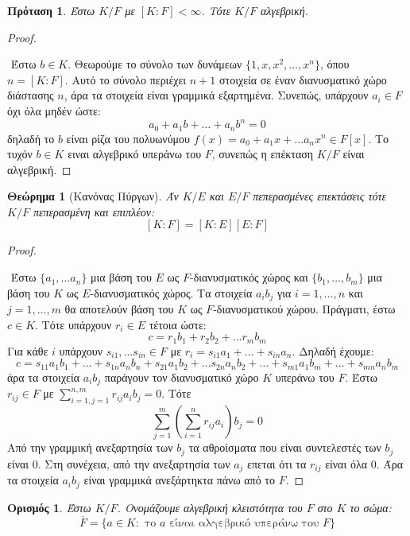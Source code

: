 \documentclass[oneside,a4paper]{article}
\newtheorem{theorem}{Θεώρημα}
\newtheorem*{defn}{Ορισμός}
\newtheorem{prop}{Πρόταση}
\begin{document}
\begin{prop}
	Έστω $K/F$ με $[K:F]<\infty$. Τότε $K/F$ αλγεβρική.
\end{prop}

\begin{proof} $ $

	$ $\newline
	Έστω $b \in K$. Θεωρούμε το σύνολο των δυνάμεων $\{1,x,x^2,\ldots,x^n\}$, όπου $n = [K:F]$. Αυτό το σύνολο περιέχει $n+1$ στοιχεία σε έναν διανυσματικό χώρο διάστασης $n$, άρα τα στοιχεία είναι γραμμικά εξαρτημένα. Συνεπώς, υπάρχουν $a_i \in F$ όχι όλα μηδέν ώστε:
	$$a_0 + a_1 b + \ldots + a_n b^n = 0$$
	δηλαδή το $b$ είναι ρίζα του πολυωνύμου $f(x) = a_0 + a_1 x + \ldots a_n x^n \in F[x]$. Το τυχόν $b \in K$ ειναι αλγεβρικό υπεράνω του $F$, συνεπώς η επέκταση $K/F$ είναι αλγεβρική.
\end{proof}

\begin{theorem}[Κανόνας Πύργων]
	Άν $K/E$ και $E/F$ πεπερασμένες επεκτάσεις τότε $K/F$ πεπερασμένη και επιπλέον:
	$$[K:F]=[K:E][E:F]$$
\end{theorem}

\begin{proof} $ $
	
	$ $\newline
	Έστω $\{a_1 , \ldots a_n\}$ μια βάση του $E$ ως $F$-διανυσματικός χώρος και $\{b_1,\ldots,b_m\}$ μια βάση του $K$ ως $E$-διανυσματικός χώρος. Τα στοιχεία $a_i b_j$ για $i=1,\ldots,n$ και $j=1,\ldots,m$ θα αποτελούν βάση του $K$ ως $F$-διανυσματικού χώρου. Πράγματι, έστω $c \in K$. Τότε υπάρχουν $r_i \in E$ τέτοια ώστε:
	$$c = r_1 b_1 + r_2 b_2 + \ldots r_m b_m$$
	Για κάθε $i$ υπάρχουν $s_{i1},\ldots s_{in} \in F$ με $r_i = s_{i1} a_1 + \ldots + s_{in} a_n$. Δηλαδή έχουμε:
	$$c = s_{11} a_1 b_1 + \ldots + s_{1n} a_n b_n + s_{21} a_1 b_2 + \ldots s_{2n} a_n b_2 + \ldots +s_{m1} a_1 b_m + \ldots + s_{mn} a_n b_m$$
	άρα τα στοιχεία $a_i b_j$ παράγουν τον διανυσματικό χώρο $K$ υπεράνω του $F$.
	Έστω $r_{ij} \in F$ με $\sum\limits_{i=1,j=1}^{n,m} r_{ij} a_i b_j = 0$. Τότε
	$$\sum\limits_{j=1}^m \left(\sum\limits_{i=1}^n r_{ij} a_i \right) b_j = 0$$
	Από την γραμμική ανεξαρτησία των $b_j$ τα αθροίσματα που είναι συντελεστές των $b_j$ είναι $0$. Στη συνέχεια, από την ανεξαρτησία των $a_j$ επεται ότι τα $r_{ij}$ είναι όλα $0$. Άρα τα στοιχεία $a_i b_j$ είναι γραμμικά ανεξάρτηκτα πάνω από το $F$.
\end{proof}

\begin{defn} Έστω $K/F$. Ονομάζουμε αλγεβρική κλειστότητα του $F$ στο $K$ το σώμα:
	$$\overline F = \{a \in K: \text{ το } a \text{ είναι αλγεβρικό υπεράνω του } F\}$$ 
\end{defn} %
\end{document}
